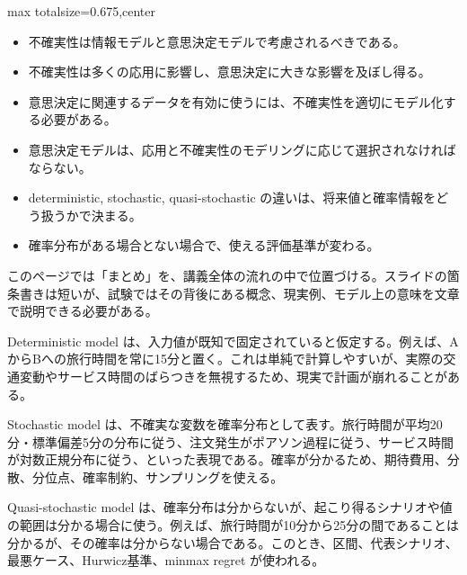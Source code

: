 \clearpage
{}
\begin{adjustbox}{max totalsize={\textwidth}{0.675\textheight},center}
\begin{minipage}{\textwidth}\scriptsize
\begin{minipage}[t]{0.485\textwidth}
\begin{itemize}
\item 不確実性は情報モデルと意思決定モデルで考慮されるべきである。
\item 不確実性は多くの応用に影響し、意思決定に大きな影響を及ぼし得る。
\item 意思決定に関連するデータを有効に使うには、不確実性を適切にモデル化する必要がある。
\item 意思決定モデルは、応用と不確実性のモデリングに応じて選択されなければならない。
\end{itemize}
\begin{itemize}
\item deterministic, stochastic, quasi-stochastic の違いは、将来値と確率情報をどう扱うかで決まる。
\item 確率分布がある場合とない場合で、使える評価基準が変わる。
\end{itemize}
\end{minipage}\hfill
\begin{minipage}[t]{0.485\textwidth}
このページでは「まとめ」を、講義全体の流れの中で位置づける。スライドの箇条書きは短いが、試験ではその背後にある概念、現実例、モデル上の意味を文章で説明できる必要がある。\par
Deterministic model は、入力値が既知で固定されていると仮定する。例えば、AからBへの旅行時間を常に15分と置く。これは単純で計算しやすいが、実際の交通変動やサービス時間のばらつきを無視するため、現実で計画が崩れることがある。\par
Stochastic model は、不確実な変数を確率分布として表す。旅行時間が平均20分・標準偏差5分の分布に従う、注文発生がポアソン過程に従う、サービス時間が対数正規分布に従う、といった表現である。確率が分かるため、期待費用、分散、分位点、確率制約、サンプリングを使える。\par
Quasi-stochastic model は、確率分布は分からないが、起こり得るシナリオや値の範囲は分かる場合に使う。例えば、旅行時間が10分から25分の間であることは分かるが、その確率は分からない場合である。このとき、区間、代表シナリオ、最悪ケース、Hurwicz基準、minmax regret が使われる。\par

\end{minipage}
\end{minipage}
\end{adjustbox}
